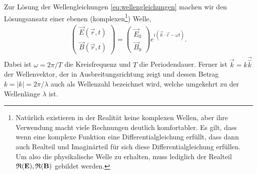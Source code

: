 Zur Lösung der Wellengleichungen \eqref{eq:wellengleichungen} machen wir den Lösungsansatz einer ebenen (komplexen\footnote{Natürlich existieren in der Realität keine komplexen Wellen, aber ihre Verwendung macht viele Rechnungen deutlich komfortabler.
    Es gilt, dass wenn eine komplexe Funktion eine Differentialgleichung erfüllt, dass dann auch Realteil und Imaginärteil für sich diese Differentialgleichung erfüllen.
    Um also die physikalische Welle zu erhalten, muss lediglich der Realteil $\operatorname{\mathfrak{R}}(\mathbf{E}),\operatorname{\mathfrak{R}}(\mathbf{B})$ gebildet werden. }) Welle,
\begin{align}
    \label{eq:ansatz_ebene_welle}
    \begin{pmatrix}
        \vec E(\vec r,t) \\
        \vec B(\vec r,t)
    \end{pmatrix}
    =
    \begin{pmatrix}
        \vec E_0 \\
        \vec B_0
    \end{pmatrix}
    e^{i(\vec k\cdot \vec r-\omega t)}.
\end{align}
Dabei ist $\omega=2\pi/T$ die Kreisfrequenz und $T$ die Periodendauer.
Ferner ist $\vec k=k \vec{\hat{k}}$ der Wellenvektor, der in Ausbreitungsrichtung zeigt und dessen Betrag $k=|k|=2\pi/\lambda$ auch als Wellenzahl bezeichnet wird, welche umgekehrt zu der Wellenlänge $\lambda$ ist.

